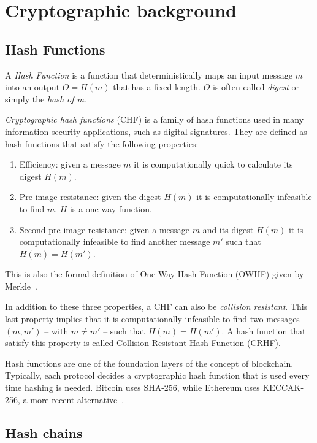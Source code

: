 \label{chapter-2}

\section{Cryptographic background}

\subsection{Hash Functions}

A \textit{Hash Function} is a function that deterministically maps an input message $m$ into an output $O=H(m)$ that has a fixed length. $O$ is often called \textit{digest} or simply the \textit{hash of m}.\

\textit{Cryptographic hash functions} (CHF) is a family of hash functions used in many information security applications, such as digital signatures. They are defined as hash functions that satisfy the following properties:

\begin{enumerate}
    \item Efficiency: given a message $m$ it is computationally quick to calculate its digest $H(m)$.
    \item Pre-image resistance: given the digest $H(m)$ it is computationally infeasible to find $m$. $H$ is a one way function.
    \item Second pre-image resistance: given a message $m$ and its digest $H(m)$ it is computationally infeasible to find another message $m'$ such that $H(m)=H(m')$.
\end{enumerate}

This is also the formal definition of One Way Hash Function (OWHF) given by Merkle~\cite{chf}. \

In addition to these three properties, a CHF can also be \textit{collision resistant}. This last property implies that it is computationally infeasible to find two messages $(m,m')$ -- with $m\neq m'$ -- such that $H(m)=H(m')$. A hash function that satisfy this property is called Collision Resistant Hash Function (CRHF).

Hash functions are one of the foundation layers of the concept of blockchain. Typically, each protocol decides a cryptographic hash function that is used every time hashing is needed. Bitcoin uses SHA-256, while Ethereum uses KECCAK-256, a more recent alternative~\cite{bitcoin,Ethereum}.

\subsection{Hash chains}

